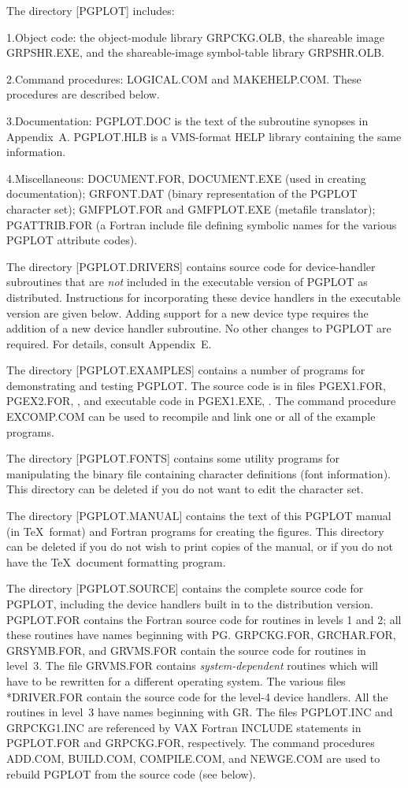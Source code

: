 The directory [PGPLOT] includes:
\smallskip
\item{1.}Object code: the object-module library GRPCKG.OLB, the
shareable image GRPSHR.EXE, and the shareable-image symbol-table
library GRPSHR.OLB. 
\item{2.}Command procedures: LOGICAL.COM and MAKEHELP.COM.  
These procedures are described below.
\item{3.}Documentation: PGPLOT.DOC is the text of the subroutine synopses in 
Appendix~A.  PGPLOT.HLB is a VMS-format HELP library containing the
same information. 
\item{4.}Miscellaneous: DOCUMENT.FOR, DOCUMENT.EXE (used in creating
documentation); GRFONT.DAT (binary representation of the PGPLOT
character set); GMFPLOT.FOR and GMFPLOT.EXE (meta\-file translator);
PGATTRIB.FOR (a Fortran include file defining symbolic names for the
various PGPLOT attribute codes).

The directory [PGPLOT.DRIVERS] contains source code for device-handler 
subroutines that are {\it not\/} included in the executable version of 
PGPLOT as distributed. Instructions for incorporating these device 
handlers in the executable version are given below. 
Adding support for a new device type requires the addition of a new 
device handler subroutine. No other changes to PGPLOT are required. For 
details, consult Appendix~E.

The directory [PGPLOT.EXAMPLES] contains a number of programs for 
demonstrating and testing PGPLOT. The source code is in files PGEX1\-.FOR, 
PGEX2\-.FOR, \etc, and executable code in PGEX1.EXE, \etc. The command 
procedure EXCOMP.COM can be used to recompile and link one or all of the 
example programs.

The directory [PGPLOT.FONTS] contains some utility programs for 
manipulating the binary file containing character definitions (font 
information). This directory can be deleted if you do not want to
edit the character set.

The directory [PGPLOT.MANUAL] contains the text of this PGPLOT manual
(in \TeX\ format) and Fortran programs for creating the figures. This 
directory can be deleted if you do not wish to print copies of the 
manual, or if you do not have the \TeX\ document formatting program.

The directory [PGPLOT.SOURCE] contains the complete source code for
PGPLOT, including the device handlers built in to the distribution
version. PGPLOT.FOR contains the Fortran source code for routines in
levels 1 and 2; all these routines have names beginning with PG.
GRPCKG.FOR, GRCHAR.FOR, GRSYMB.FOR, and GRVMS.FOR contain the source code for
routines in level~3. The file GRVMS.FOR contains {\it 
system-dependent\/} routines which will have to be rewritten for a 
different operating system. The various files *DRIVER.FOR contain the source
code for the level-4 device handlers. All the routines in level~3 have
names beginning with GR. The files PGPLOT.INC and GRPCKG1.INC are
referenced by VAX Fortran INCLUDE statements in PGPLOT.FOR and
GRPCKG.FOR, respectively. The command procedures ADD.COM, BUILD\-.COM,
COMPILE.COM, and NEWGE.COM are used to rebuild PGPLOT from the source
code (see below). 

